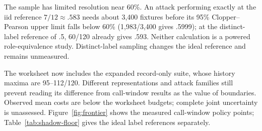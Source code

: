 The sample has limited resolution near 60\%. An attack performing exactly at the iid reference $7/12\approx.583$ needs about 3,400 fixtures before its 95\% Clopper--Pearson upper limit falls below 60\% (1,983/3,400 gives .5999); at the distinct-label reference of .5, 60/120 already gives .593. Neither calculation is a powered role-equivalence study. Distinct-label sampling changes the ideal reference and remains unmeasured.

The worksheet now includes the expanded record-only suite, whose history maxima are 95--112/120. Different representations and attack families still prevent reading its difference from call-window results as the value of boundaries. Observed mean costs are below the worksheet budgets; complete joint uncertainty is unassessed. Figure~\ref{fig:frontier} shows the measured call-window policy points; Table~\ref{tab:shadow-floor} gives the ideal label references separately.



